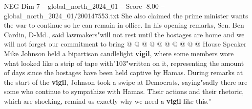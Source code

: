 \begin{textsample}{NEG Dim 7 – global\_north\_2024\_01 – Score -8.00 – global\_north\_2024\_01/200147553.txt}
She also claimed the prime minister wants the war to continue so he can remain in office.
In his opening remarks, Sen.
Ben Cardin, D-Md., said lawmakers"will not rest until the hostages are home and we will not forget our commitment to bring @ @ @ @ @ @ @ @ @ @ House Speaker Mike Johnson held a bipartisan candlelight \textbf{vigil}, where some members wore what looked like a strip of tape with"103"written on it, representing the amount of days since the hostages have been held captive by Hamas.
During remarks at the start of the \textbf{vigil}, Johnson took a swipe at Democrats, saying"sadly there are some who continue to sympathize with Hamas.
Their actions and their rhetoric, which are shocking, remind us exactly why we need a \textbf{vigil} like this."

\end{textsample}
